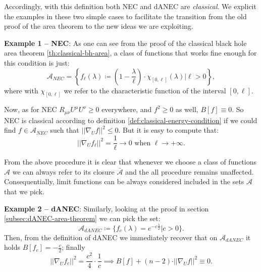 	Accordingly, with this definition both NEC and dANEC are \emph{classical}. We explicit the examples in these two simple cases to facilitate the transition from the old proof of the area theorem to the new ideas we are exploiting.

	\textbf{Example 1 -- NEC}: As one can see from the proof of the classical black hole area theorem \ref{th:classical-bh-area}, a class of functions that works fine enough for this condition is just:
	\[
	\mathcal{A}_{NEC} = \left\{ f_{\ell}(\lambda) \coloneqq \left(1 - \frac{\lambda}{\ell}\right) \cdot \chi_{[0, \ell]}(\lambda) \vert \ell > 0 \right\},
	\]
	where with \(\chi_{[0, \ell]}\) we refer to the characteristic function of the interval \([0,\ell]\).

	Now, as for NEC \(R_{\mu\nu}U^{\mu}U^{\nu} \ge 0\) everywhere, and \(f^2 \ge 0\) as well, \(B[f] \equiv 0\). So NEC is classical according to definition \ref{def:classical-energy-condition} if we could find \(f \in \mathcal{A}_{NEC}\) such that \(\vert\vert \nabla_U f \vert\vert^2 \le 0\). But it is easy to compute that:
	\[
		\vert\vert \nabla_U f_{\ell} \vert\vert^2 = \frac{1}{\ell} \longrightarrow 0 \text{ when } \ell \rightarrow +\infty.
	\]
	\begin{remark}
		From the above procedure it is clear that whenever we choose a class of functions \(\mathcal{A}\) we can always refer to its closure \(\bar{\mathcal{A}}\) and the all procedure remains unaffected. Consequentially, limit functions can be always considered included in the sets \(\mathcal{A}\) that we pick.
	\end{remark}

	\textbf{Example 2 -- dANEC}: Similarly, looking at the proof in section \ref{subsec:dANEC-area-theorem} we can pick the set:
	\[
	\mathcal{A}_{dANEC} \coloneqq \{ f_c(\lambda) = e^{-c\frac{\lambda}{2}} \vert c >0\}.	
	\]
	Then, from the definition of dANEC we immediately recover that on \(\mathcal{A}_{dANEC}\) it holds \(B[f_c] = -\frac{c}{2}\); finally 
	\[
		\vert\vert \nabla_U f_{c} \vert\vert^2 = \frac{c^2}{4} \cdot \frac{1}{c} \implies B[f] + (n - 2) \cdot \vert\vert \nabla_U f \vert\vert^2 \equiv 0.
	\]


